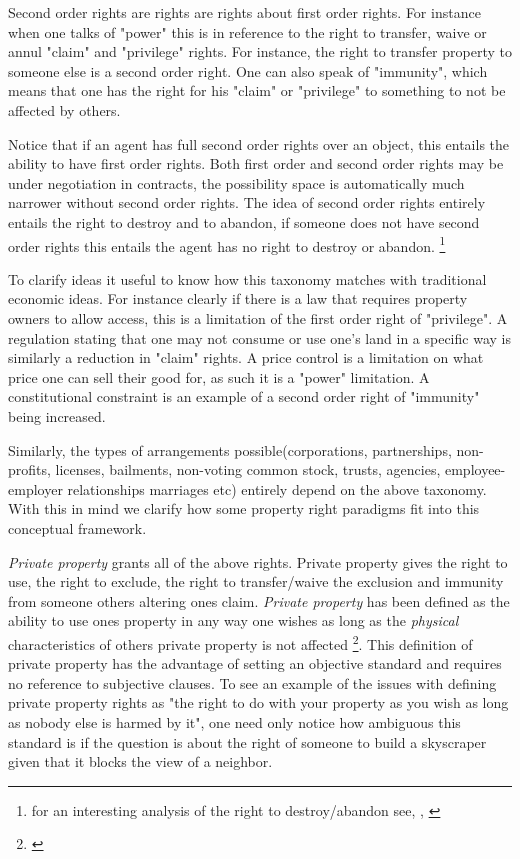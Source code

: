 \documentclass[12pt]{article}
\numberwithin{equation}{section}
\begin{document}
Second order rights are rights are rights about first order rights. For instance when one talks of "power" this is in reference to the right to transfer, waive or annul "claim" and "privilege" rights. For instance, the right to transfer property to someone else is a second order right. One can also speak of "immunity", which means that one has the right for his "claim" or "privilege" to something to not be affected by others. 

Notice that if an agent has full second order rights over an object, this entails the ability to have first order rights. Both first order and second order rights may be under negotiation in contracts, the possibility space is automatically much narrower without second order rights. The idea of second order rights entirely entails the right to destroy and to abandon, if someone does not have second order rights this entails the agent has no right to destroy or abandon. \footnote{for an interesting analysis of the right to destroy/abandon see, \cite{Strahilevitz2005}, \cite{Strahilevitz2009}} 

To clarify ideas it useful to know how this taxonomy matches with traditional economic ideas. For instance clearly if there is a law that requires property owners to allow access, this is a limitation of the first order right of "privilege". A regulation stating that one may not consume or use one's land in a specific way is similarly a reduction in "claim" rights. A price control is a limitation on what price one can sell their good for, as such it is a "power" limitation. A constitutional constraint is an example of a second order right of "immunity" being increased. 

Similarly, the types of arrangements possible(corporations, partnerships, non-profits, licenses, bailments, non-voting common stock, trusts, agencies, employee-employer relationships marriages etc) entirely depend on the above taxonomy. With this in mind we clarify how some property right paradigms fit into this conceptual framework. 

\textit{Private property} grants all of the above rights. Private property gives the right to use, the right to exclude, the right to transfer/waive the exclusion and immunity from someone others altering ones claim. \textit{Private property} has been defined as the ability to use ones property in any way one wishes as long as the \textit{physical} characteristics of others private property is not affected \footnote{\cite{Alchian1965}}. This definition of private property has the advantage of setting an objective standard and requires no reference to subjective clauses. To see an example of the issues with defining private property rights as "the right to do with your property as you wish as long as nobody else is harmed by it", one need only notice how ambiguous this standard is if the question is about the right of someone to build a skyscraper given that it blocks the view of a neighbor. 
\end{document}
